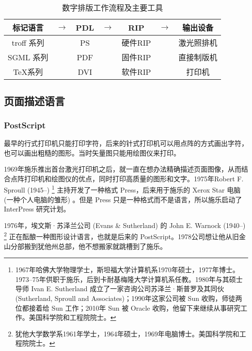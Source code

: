 \begin{table}[!htbp]
\centering
\caption{数字排版工作流程及主要工具}
\label{tab:digital_typesetting}
\begin{tabular}{ccccccc}
    \toprule
    标记语言 & $\to$ & PDL & $\to$ & RIP & $\to$ & 输出设备 \\
    \midrule
    troff 系列 & & PS  & & 硬件RIP & & 激光照排机 \\
    SGML 系列  & & PDF & & 固件RIP & & 直接制版机 \\
    \TeX 系列 & & DVI & & 软件RIP & & 打印机 \\
    \bottomrule
\end{tabular}
\end{table}

\subsection{页面描述语言}

\subsubsection{PostScript}
最早的行式打印机只能打印字符，后来的针式打印机可以用点阵的方式画出字符，也可以画出粗糙的图形。当时矢量图只能用绘图仪来打印。

1969年施乐\indexXerox 推出首台激光打印机之后，就一直在想办法精确描述页面图像，从而结合点阵打印机和绘图仪的优点，同时打印高质量的图形和文字。1975年Robert F. Sproull (1945--)\indexSproull{} \footnote{1967年哈佛大学物理学士，斯坦福大学计算机系1970年硕士，1977年博士。1973--75年供职于施乐，后到卡耐基梅隆大学计算机系任教。1980年与其硕士导师 Ivan E. Sutherland 成立了一家咨询公司苏泽兰·斯普罗及其同伙 (Sutherland, Sproull and Associates)；1990年这家公司被 Sun 收购，师徒两位都接着给 Sun 工作；2010年 Sun 被 Oracle 收购，他留下来继续从事研究工作。美国科学院和工程院院士。} 主持开发了一种格式 Press，后来用于施乐的 Xerox Star 电脑 (一种个人电脑的雏形) 。但是 Press 只是一种格式而不是语言，所以施乐启动了 InterPress 研究计划。

1976年，埃文斯·苏泽兰公司 (Evans \& Sutherland)\indexEvansSutherland{} 的 John E. Warnock (1940--)\indexWarnock{} \footnote{犹他大学数学系1961年学士，1964年硕士，1969年电脑博士。美国科学院和工程院院士。} 正在酝酿一种图形设计语言，也就是后来的 PostScript。1978公司想让他从旧金山分部搬到犹他州总部，他不想搬家就跳槽到了施乐。

